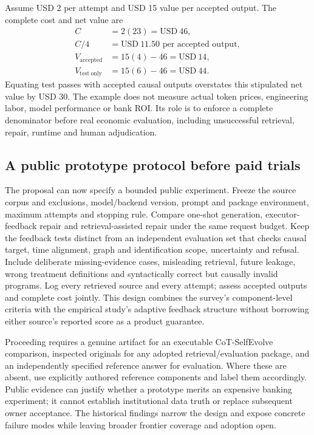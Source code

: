 Assume USD 2 per attempt and USD 15 value per accepted output. The complete
cost and net value are
\begin{align}
 C&=2(23)=\mathrm{USD}\ 46,\nonumber\\
 C/4&=\mathrm{USD}\ 11.50\text{ per accepted output},\nonumber\\
 V_{\mathrm{accepted}}&=15(4)-46=\mathrm{USD}\ 14,\nonumber\\
 V_{\mathrm{test\ only}}&=15(6)-46=\mathrm{USD}\ 44.
 \label{exec19:ragrepair-cost}
\end{align}
Equating test passes with accepted causal outputs overstates this stipulated
net value by USD 30. The example does not measure actual token prices,
engineering labor, model performance or bank ROI. Its role is to enforce a
complete denominator before real economic evaluation, including unsuccessful
retrieval, repair, runtime and human adjudication.
\citep{exec19_retrieval_repair_reference}

\subsection{A public prototype protocol before paid trials}
\label{exec19:ragrepair-protocol}
The proposal can now specify a bounded public experiment. Freeze the source
corpus and exclusions, model/backend version, prompt and package environment,
maximum attempts and stopping rule. Compare one-shot generation, executor-
feedback repair and retrieval-assisted repair under the same request budget.
Keep the feedback tests distinct from an independent evaluation set that checks causal
target, time alignment, graph and identification scope, uncertainty and refusal.
Include deliberate missing-evidence cases, misleading retrieval, future leakage,
wrong treatment definitions and syntactically correct but causally invalid
programs. Log every retrieved source and every attempt; assess accepted outputs
and complete cost jointly. This design combines the survey's component-level
criteria with the empirical study's adaptive feedback structure without
borrowing either source's reported score as a product guarantee.
\citep{exec19_rag_survey,exec19_selfcorrection_study,exec19_retrieval_repair_reference}

Proceeding requires a genuine artifact for an executable CoT-SelfEvolve
comparison, inspected originals for any adopted retrieval/evaluation package,
and an independently specified reference answer for evaluation. Where these are absent,
use explicitly authored reference components and label them accordingly.
Public evidence can justify whether a prototype merits an expensive banking
experiment; it cannot establish institutional data truth or replace subsequent
owner acceptance. The historical findings narrow the design and expose concrete
failure modes while leaving broader frontier coverage and adoption open.
\citep{exec19_rag_survey,exec19_selfcorrection_study}
